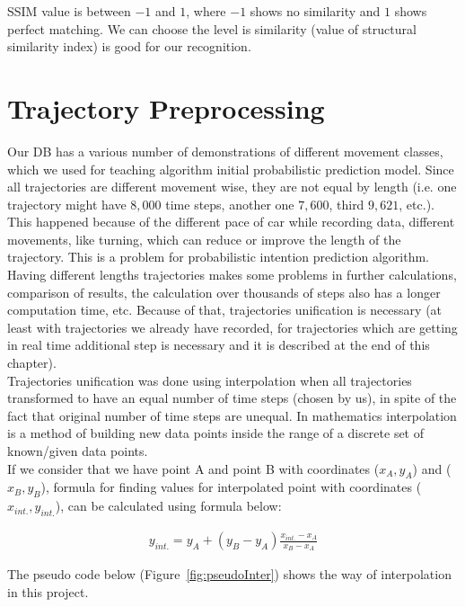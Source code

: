 \gls{SSIM} value is between $-1$ and $1$, where $-1$ shows no similarity and $1$ shows perfect matching. We can choose the level is similarity (value of structural similarity index) is good for our recognition.

\section{Trajectory Preprocessing}

Our \gls{DB} has a various number of demonstrations of different movement classes, which we used for teaching algorithm initial probabilistic prediction model. Since all trajectories are different movement wise, they are not equal by length (i.e. one trajectory might have $8,000$ time steps, another one $7,600$, third $9,621$, etc.). This happened because of the different pace of car while recording data, different movements, like turning, which can reduce or improve the length of the trajectory. This is a problem for probabilistic intention prediction algorithm. Having different lengths trajectories makes some problems in further calculations, comparison of results, the calculation over thousands of steps also has a longer computation time, etc. Because of that, trajectories unification is necessary (at least with trajectories we already have recorded, for trajectories which are getting in real time additional step is necessary and it is described at the end of this chapter).   \\
Trajectories unification was done using interpolation when all trajectories transformed to have an equal number of time steps (chosen by us), in spite of the fact that original number of time steps are unequal. In mathematics interpolation is a method of building new data points inside the range of a discrete set of known/given data points. \\
If we consider that we have point A and point B with coordinates ($x_{A}, y_{A}$) and ($x_{B}, y_{B}$), formula for finding values for interpolated point with coordinates ($x_{int.}, y_{int.}$), can be calculated using formula below:

\begin{equation}
\begin{split}
y_{int.} = \displaystyle y_{A} + (y_{B} - y_{A}) \frac {x_{int.} - x_{A}}{x_{B} - x_{A}} 
\end{split}
\label{eqn:interpolated}
\end{equation}


The pseudo code below (Figure~\ref{fig:pseudoInter}) shows the way of interpolation in this project.

